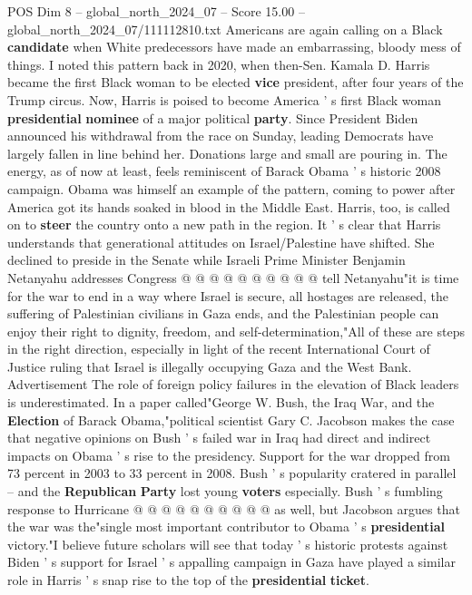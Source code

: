 \begin{textsample}{POS Dim 8 – global\_north\_2024\_07 – Score 15.00 – global\_north\_2024\_07/111112810.txt}  \label{ex:f8_pos_042}
Americans are again calling on a Black \textbf{candidate} when White predecessors have made an embarrassing, bloody mess of things.
I noted this pattern back in 2020, when then-Sen.
Kamala D.
Harris became the first Black woman to be elected \textbf{vice} president, after four years of the Trump circus.
Now, Harris is poised to become America ' s first Black woman \textbf{presidential} \textbf{nominee} of a major political \textbf{party}.
Since President Biden announced his withdrawal from the race on Sunday, leading Democrats have largely fallen in line behind her.
Donations large and small are pouring in.
The energy, as of now at least, feels reminiscent of Barack Obama ' s historic 2008 campaign.
Obama was himself an example of the pattern, coming to power after America got its hands soaked in blood in the Middle East.
Harris, too, is called on to \textbf{steer} the country onto a new path in the region.
It ' s clear that Harris understands that generational attitudes on Israel/Palestine have shifted.
She declined to preside in the Senate while Israeli Prime Minister Benjamin Netanyahu addresses Congress @ @ @ @ @ @ @ @ @ @ tell Netanyahu"it is time for the war to end in a way where Israel is secure, all hostages are released, the suffering of Palestinian civilians in Gaza ends, and the Palestinian people can enjoy their right to dignity, freedom, and self-determination,"All of these are steps in the right direction, especially in light of the recent International Court of Justice ruling that Israel is illegally occupying Gaza and the West Bank.
Advertisement The role of foreign policy failures in the elevation of Black leaders is underestimated.
In a paper called"George W.
Bush, the Iraq War, and the \textbf{Election} of Barack Obama,"political scientist Gary C.
Jacobson makes the case that negative opinions on Bush ' s failed war in Iraq had direct and indirect impacts on Obama ' s rise to the presidency.
Support for the war dropped from 73 percent in 2003 to 33 percent in 2008.
Bush ' s popularity cratered in parallel -- and the \textbf{Republican} \textbf{Party} lost young \textbf{voters} especially.
Bush ' s fumbling response to Hurricane @ @ @ @ @ @ @ @ @ @ as well, but Jacobson argues that the war was the"single most important contributor to Obama ' s \textbf{presidential} victory."I believe future scholars will see that today ' s historic protests against Biden ' s support for Israel ' s appalling campaign in Gaza have played a similar role in Harris ' s snap rise to the top of the \textbf{presidential} \textbf{ticket}.

\end{textsample}
